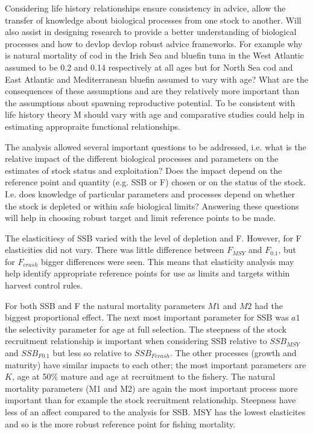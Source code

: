 \documentclass[10pt]{article}
\begin{document}
Considering life history relationships ensure consistency in advice, allow the transfer of knowledge about biological processes from one stock to 
another. Will also assist in designing research to provide a better understanding of biological processes and how to devlop devlop robust advice
frameworks. For example why is natural mortality of cod in the Irish Sea and bluefin tuna in the West Atlantic assumed to be 0.2 and 0.14 respectively 
at all ages but for North Sea cod and East Atlantic and Mediterranean bluefin assumed to vary with age? What are the consequences of these assumptions
and are they relatively more important than the assumptions about spawning reproductive potential. To be consistent with life history theory M should 
vary with age and comparative studies could help in estimating appropraite functional relationships. 

The analysis allowed several important questions to be addressed, i.e. what is the relative impact of the different biological processes and parameters 
on the estimates of stock status and exploitation? Does the impact depend on the reference point and quantity (e.g. SSB or F) chosen or on the status 
of the stock. I.e. does knowledge of particular parameters and processes depend on whether the stock is depleted or within safe biological limits? 
Answering these questions will help in choosing robust target and limit reference points to be made.

The elasticitiesy of SSB varied with the level of depletion and F. However, for F elasticities did not vary. There was 
little difference between $F_{MSY}$ and $F_{0.1}$, but for $F_{crash}$ bigger differences were seen. This means that elasticity analysis may help identify
appropriate reference points for use as limits and targets within harvest control rules.  
 
For both SSB and F the natural mortality parameters $M1$ and $M2$ had the biggest  proportional effect. The next most important parameter for SSB was $a1$ 
the selectivity parameter for age at full selection. The steepness of the stock recruitment relationship is important when  considering SSB relative to 
$SSB_{MSY}$ and $SSB_{F0.1}$ but less so relative to $SSB_{Fcrash}$. The other processes (growth and maturity) have similar impacts to each other; 
the most important parameters are $K$, age at 50\% mature and age at recruitment to the fishery. The natural mortality parameters (M1 and M2) 
are again the most important process more important than for example the stock recruitment relationship. Steepness have less of an affect compared to the analysis 
for SSB. MSY has the lowest elasticites and so is the more robust reference point for fishing mortality. 
\end{document}
